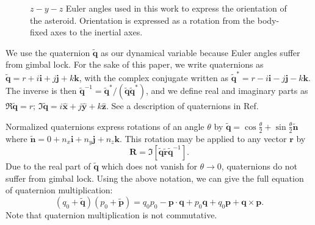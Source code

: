 \documentclass{aastex631}
\newcommand{\unit}[1]{\hat{\bm{#1}}}
\newcommand{\brackets}[1]{\left[ #1 \right]}
\newcommand{\quat}[1]{\widetilde{\bm{#1}}}
\begin{document}
\begin{figure}
    \centering
    \caption{$z-y-z$ Euler angles used in this work to express the orientation of the asteroid. Orientation is expressed as a rotation from the body-fixed axes to the inertial axes.}
    \label{fig:euler-angles}
\end{figure}

We use the quaternion $\quat q$ as our dynamical variable because Euler angles suffer from gimbal lock. For the sake of this paper, we write quaternions as $\quat q = r + i \bm i + j \bm j + k \bm k$, with the complex conjugate written as $\quat q^* = r - i \bm i - j \bm j - k \bm k$. The inverse is then $\quat q^{-1} = \quat q^* / (\quat q \quat q^*)$, and we define real and imaginary parts as $\Re \quat q = r$; $\Im \quat q = i \unit x + j \unit y + k \unit z$. See a description of quaternions in Ref.~\cite{2008arXiv0811.2889G}

Normalized quaternions express rotations of an angle $\theta$ by $\quat q = \cos\frac{\theta}{2} + \sin\frac{\theta}{2}\quat n$ where $\quat n = 0 + n_x \bm i + n_y \bm j + n_z\bm k$. This rotation may be applied to any vector $\bm r$ by
\begin{equation}
\bm R = \Im \brackets{\quat q \quat r\quat q^{-1} }.
\label{eqn:quat-rot}
\end{equation}
Due to the real part of $\quat q$ which does not vanish for $\theta \rightarrow 0$, quaternions do not suffer from gimbal lock. Using the above notation, we can give the full equation of quaternion multiplication:
\begin{equation}
(q_0 + \quat q) (p_0 + \quat p) = q_0 p_0 - \bm p \cdot \bm q + p_0 \bm q + q_0 \bm p + \bm q \times \bm p.
\label{eqn:quat-mult}
\end{equation}
Note that quaternion multiplication is not commutative.
\end{document}
